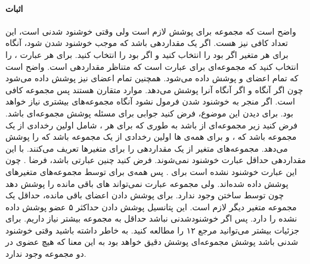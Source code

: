 \documentclass[a4paper]{article}
\begin{document}
	\paragraph{اثبات}
	واضح است که 
	مجموعه برای پوشش
	لازم است ولی وقتی 
	\lr{$\phi$}
	خوشنود شدنی است، این تعداد کافی نیز هست. اگر 
	یک مقداردهی باشد که موجب خوشنود شدن 
	\lr{$\phi$}
	شود، آنگاه برای هر متغیر
	اگر 
	بود 
	را انتخاب کنید و اگر 
	بود
	را انتخاب کنید. برای هر عبارت
	،
	را انتخاب کنید که مجموعه‌ای برای عبارت
	است که متناظر مقداردهی 
	است. واضح است که تمام اعضای
	و
	پوشش داده می‌شود. همچنین تمام اعضای
	نیز پوشش داده می‌شود چون اگر 
	آنگاه
	و اگر 
	آنگاه
	آنرا پوشش می‌دهد. موارد
	متقارن هستند پس 
	مجموعه کافی است. اگر 
	منجر به خوشنود شدن فرمول نشود آنگاه مجموعه‌های بیشتری نیاز خواهد بود. برای دیدن این موضوع، فرض کنید
	جوابی برای مسئله پوشش مجموعه‌ای باشد. فرض کنید 
	زیر مجموعه‌ای از 
	باشد به طوری که برای هر 
	،
	شامل اولین رخدادی از یک مجموعه باشد که
	، و برای همه‌ی
	ها اولین رخدادی از یک مجموعه باشد که
	را پوشش می‌دهد. مجموعه‌های متغیر از
	یک مقداردهی 
	را برای متغیرها تعریف می‌کنند. با این مقداردهی حداقل
	عبارت  خوشنود نمی‌شوند. فرض کنید
	چنین عبارتی باشد، فرضا
	.
	چون این عبارت خوشنود نشده است
	برای
	.
	پس همه‌ی
	برای 
	توسط مجموعه‌های متغیرهای پوشش داده شده‌اند. ولی مجموعه عبارت
	نمی‌تواند 
	های باقی مانده را پوشش دهد چون توسط ساختن وجود ندارد. برای پوشش دادن اعضای باقی مانده، حداقل یک مجموعه متغیر
	دیگر لازم است. این پتانسیل پوشش دادن حداکثر ۵ عضو پوشش داده نشده را دارد. پس اگر 
	\lr{$\phi$}
	خوشنودشدنی نباشد حداقل به 
	مجموعه بیشتر نیاز داریم. برای جزئیات بیشتر می‌توانید مرجع ۱۲ را مطالعه کنید. به خاطر داشته باشید وقتی
	\lr{$\phi$}
	خوشنود شدنی باشد پوشش مجموعه‌ای پوشش دقیق خواهد بود به این معنا که هیچ عضوی در دو مجموعه وجود ندارد.
\end{document}
